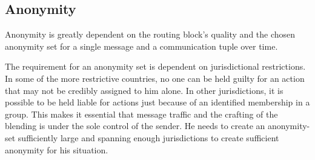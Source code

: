 \subsection{Anonymity}
Anonymity is greatly dependent on the routing block's quality and the chosen anonymity set for a single message and a communication tuple over time. 

The requirement for an anonymity set is dependent on jurisdictional restrictions. In some of the more restrictive countries, no one can be held guilty for an action that may not be credibly assigned to him alone. In other jurisdictions, it is possible to be held liable for actions just because of an identified membership in a group. This makes it essential that message traffic and the crafting of the blending is under the sole control of the sender. He needs to create an anonymity-set sufficiently large and spanning enough jurisdictions to create sufficient anonymity for his situation.
